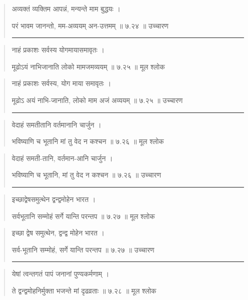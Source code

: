\begin{quotation}
अव्यक्तं व्यक्तिम आपन्नं, मन्यन्ते माम बुद्धयः  ।  

परं भावम जानन्तो, मम-अव्ययम् अन-उत्तमम्‌  ॥ ७.२४ ॥  उच्चारण

\noindent\rule{16cm}{0.4pt} 
\end{quotation}


\begin{quotation} 
नाहं प्रकाशः सर्वस्य योगमायासमावृतः  ।  

मूढोऽयं नाभिजानाति लोको मामजमव्ययम्‌  ॥ ७.२५ ॥  मूल श्लोक
\end{quotation}

\begin{quotation}
नाहं प्रकाशः सर्वस्य, योग माया समावृतः  ।  

मूढोऽ अयं नाभि-जानाति, लोको माम अजं अव्ययम्‌  ॥ ७.२५ ॥  उच्चारण

\noindent\rule{16cm}{0.4pt} 
\end{quotation}


\begin{quotation} 
वेदाहं समतीतानि वर्तमानानि चार्जुन  ।  

भविष्याणि च भूतानि मां तु वेद न कश्चन  ॥ ७.२६ ॥  मूल श्लोक
\end{quotation}

\begin{quotation}
वेदाहं समती-तानि, वर्तमान-आनि चार्जुन  ।  

भविष्याणि च भूतानि, मां तु वेद न कश्चन  ॥ ७.२६ ॥  उच्चारण

\noindent\rule{16cm}{0.4pt} 
\end{quotation}


\begin{quotation} 
इच्छाद्वेषसमुत्थेन द्वन्द्वमोहेन भारत  ।  

सर्वभूतानि सम्मोहं सर्गे यान्ति परन्तप  ॥ ७.२७ ॥  मूल श्लोक
\end{quotation}

\begin{quotation}
इच्छा द्वेष समुत्थेन, द्वन्द्व मोहेन भारत  ।  

सर्व-भूतानि सम्मोहं, सर्गे यान्ति परन्तप  ॥ ७.२७ ॥  उच्चारण

\noindent\rule{16cm}{0.4pt} 
\end{quotation}


\begin{quotation} 
येषां त्वन्तगतं पापं जनानां पुण्यकर्मणाम्‌  ।  

ते द्वन्द्वमोहनिर्मुक्ता भजन्ते मां दृढव्रताः  ॥ ७.२८ ॥  मूल श्लोक
\end{quotation}

